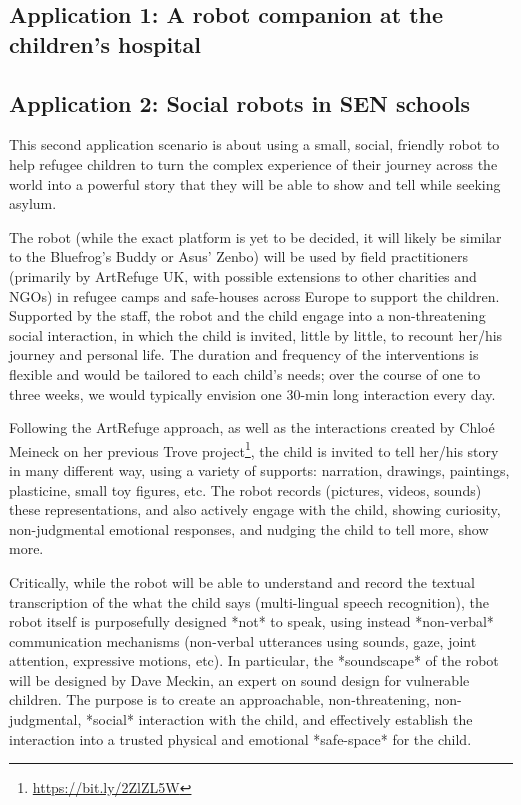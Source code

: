 \documentclass[11pt]{report}
\begin{document}
\subsection{Application 1: A robot companion at the children's hospital}

\subsection{Application 2: Social robots in SEN schools}

This second application scenario is about using a small, social, friendly robot
to help refugee children to turn the complex experience of their journey across
the world into a powerful story that they will be able to show and tell while
seeking asylum.

The robot (while the exact platform is yet to be decided, it will likely be
similar to the Bluefrog's Buddy or Asus' Zenbo) will be used by field
practitioners (primarily by ArtRefuge UK, with possible extensions to other
charities and NGOs) in refugee camps and safe-houses across Europe to support
the children. Supported by the staff, the robot and the child engage into a
non-threatening social interaction, in which the child is invited, little by
little, to recount her/his journey and personal life. The duration and frequency
of the interventions is flexible and would be tailored to each child's needs;
over the course of one to three weeks, we would typically envision one 30-min
long interaction every day.

Following the ArtRefuge approach, as well as the interactions created by Chloé
Meineck on her previous Trove project\footnote{\url{https://bit.ly/2ZlZL5W}},
the child is invited to tell her/his story in many different way, using a
variety of supports: narration, drawings, paintings, plasticine, small toy
figures, etc.  The robot records (pictures, videos, sounds) these
representations, and also actively engage with the child, showing curiosity,
non-judgmental emotional responses, and nudging the child to tell more, show
more.

Critically, while the robot will be able to understand and record the textual
transcription of the what the child says (multi-lingual speech recognition),
the robot itself is purposefully designed *not* to speak, using instead *non-verbal*
communication mechanisms (non-verbal utterances using sounds, gaze, joint
attention, expressive motions, etc). In particular, the *soundscape* of the
robot will be designed by Dave Meckin, an expert on sound design for vulnerable
children. The purpose is to create an approachable, non-threatening,
non-judgmental, *social* interaction with the child, and effectively establish
the interaction into a trusted physical and emotional *safe-space* for the
child.
\end{document}
